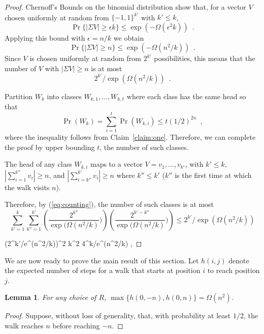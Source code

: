 \documentclass{article}
\newtheorem{lem}{Lemma}
\begin{document}
\begin{proof}
Chernoff's Bounds on the binomial distribution show that, for a 
vector $V$ chosen uniformly at random from $\{-1,1\}^{k'}$ with $k' \le k$,
\[
   \Pr\{|\Sigma V| \ge \epsilon k\} \le \exp({-\Omega(\epsilon^2 k)}) \enspace .
\]
Applying this bound with $\epsilon = n/k$ we obtain
\[
   \Pr\{|\Sigma V| \ge n\} \le \exp({-\Omega(n^2/k)}) \enspace .
\]
Since $V$ is chosen uniformly at random from $2^{k'}$ possibilities,
this means that the number of $V$ with $|\Sigma V| \ge n$ is at most
\begin{equation}
  2^{k'}/\exp({\Omega(n^2/k)}) \enspace.
  \label{eq:counting}
\end{equation}

Partition $W_k$ into classes $W_{k,1},\ldots,W_{k,t}$ where each class has
the same head so that
\[
  \Pr(W_k) = \sum_{i=1}^t \Pr(W_{k,i}) \le t(1/2)^{2n} \enspace ,
\]
where the inequality follows from Claim~\ref{claim:one}.
Therefore, we can complete the proof by upper bounding 
$t$, the number of such classes.

The head of any class $W_{k,i}$ maps to a vector $V=v_1,\ldots,v_{k'}$,
with $k'\le k$, $\left|\sum_{i=1}^{k''} v_i \right| \ge n$, and
$\left|\sum_{i=k''}^{k'} v_i \right| \ge n$ where $k'' \le k'$ ($k''$
is the first time at which the walk visits $n$).

Therefore, by (\ref{eq:counting}), the number of such classes is at most
\[
  \sum_{k'=1}^{k}\sum_{k''=1}^{k'} 
     \left(\frac{2^{k''}}{\exp({\Omega(n^2/k)}})\right)
     \left(\frac{2^{k'-k''}}{\exp({\Omega(n^2/k)}})\right)
   \le 2^{k'}/\exp({\Omega(n^2/k)})
\]

(2^{k'}/e^{\Omega(n^2/k)})^2
  \le k^2 4^{k}/e^{\Omega(n^2/k)} \enspace ,
\]
\end{proof}

We are now ready to prove the main result of this section.  Let $h(i,j)$ denote the expected number of steps for a walk that starts at position $i$ to reach position $j$.

\begin{lem}
For any choice of $R$, $\max\{h(0,-n), h(0,n)\} = \Omega(n^2)$.
\end{lem}

\begin{proof}
Suppose, without loss of generality, that, with probability at least $1/2$, the
walk reaches $n$ before reaching $-n$.



\end{proof}
\end{document}
